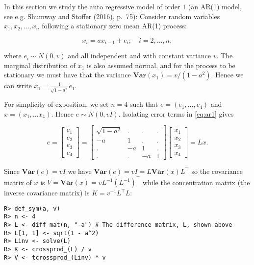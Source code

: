 In this section we study the auto regressive model of order \(1\) (an AR(1) model, see
e.g. Shumway and Stoffer (2016), p.~75):
Consider random variables \(x_1, x_2, \dots, x_n\) following a stationary zero mean AR(1) process:

\begin{equation}
  x_i = a x_{i-1} + e_i; \quad i=2, \dots, n,
  \label{eq:ar1}
\end{equation}

where \(e_i \sim N(0, v)\) and all independent and with constant variance \(v\).
The marginal distribution of \(x_1\) is also assumed normal, and for the process to be stationary
we must have that the variance \(\mathbf{Var}(x_1) = v / (1-a^2)\).
Hence we can write \(x_1 = \frac 1 {\sqrt{1-a^2}} e_1\).

For simplicity of exposition, we set \(n=4\) such that \(e=(e_1, \dots, e_4)\) and \(x=(x_1, \dots x_4)\). Hence \(e \sim N(0, v I)\). Isolating
error terms in \eqref{eq:ar1} gives

\begin{equation}
  e= \left[\begin{matrix}e_{1}\\e_{2}\\e_{3}\\e_{4}\end{matrix}\right] = \left[\begin{matrix}\sqrt{1 - a^{2}} & . & . & .\\- a & 1 & . & .\\. & - a & 1 & .\\. & . & - a & 1\end{matrix}\right] \left[\begin{matrix}x_{1}\\x_{2}\\x_{3}\\x_{4}\end{matrix}\right] = L x  .
\end{equation}

Since
\(\mathbf{Var}(e)=v I\) we have \(\mathbf{Var}(e)=v I=L \mathbf{Var}(x) L^\top\) so the covariance matrix of \(x\) is \(V=\mathbf{Var}(x) = v L^{-1} \left (L^{-1} \right )^\top\) while the concentration matrix (the inverse covariance
matrix) is \(K=v^{-1}L^\top L\):

\begin{verbatim}
R> def_sym(a, v)
R> n <- 4
R> L <- diff_mat(n, "-a") # The difference matrix, L, shown above
R> L[1, 1] <- sqrt(1 - a^2)
R> Linv <- solve(L)
R> K <- crossprod_(L) / v
R> V <- tcrossprod_(Linv) * v
\end{verbatim}

